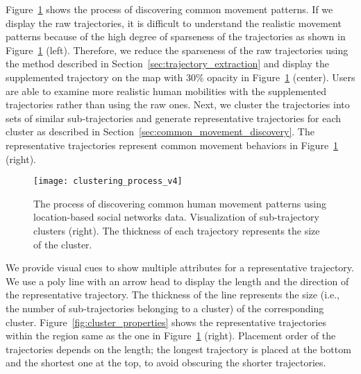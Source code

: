 Figure~\ref{fig:clustering_process} shows the process of discovering common movement patterns.
If we display the raw trajectories, it is difficult to understand the realistic movement patterns because of the high degree of sparseness of the trajectories as shown in Figure~\ref{fig:clustering_process} (left).
Therefore, we reduce the sparseness of the raw trajectories using the method described in Section~\ref{sec:trajectory_extraction} and display the supplemented trajectory on the map with 30\% opacity in Figure~\ref{fig:clustering_process} (center).
Users are able to examine more realistic human mobilities with the supplemented trajectories rather than using the raw ones.
Next, we cluster the trajectories into sets of similar sub-trajectories and generate representative trajectories for each cluster as described in Section~\ref{sec:common_movement_discovery}.
The representative trajectories represent common movement behaviors in Figure~\ref{fig:clustering_process} (right).

\begin{figure}[hbt]
\centering
\texttt{[image: clustering\_process\_v4]}
\caption{The process of discovering common human movement patterns using location-based social networks data.
Visualization of sub-trajectory clusters (right). The thickness of each trajectory represents the size of the cluster.}
\label{fig:clustering_process}
\end{figure}

We provide visual cues to show multiple attributes for a representative trajectory.
We use a poly line with an arrow head to display the length and the direction of the representative trajectory.
The thickness of the line represents the size (i.e., the number of sub-trajectories belonging to a cluster) of the corresponding cluster.
Figure~\ref{fig:cluster_properties} shows the representative trajectories within the region same as the one in Figure~\ref{fig:clustering_process} (right).
Placement order of the trajectories depends on the length; the longest trajectory is placed at the bottom and the shortest one at the top, to avoid obscuring the shorter trajectories.


